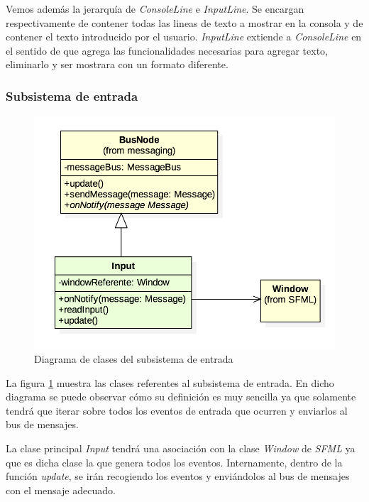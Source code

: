 \bigskip

Vemos además la jerarquía de \textit{ConsoleLine} e \textit{InputLine}. Se encargan respectivamente de contener todas las lineas de texto a mostrar en la consola y de contener el texto introducido por el usuario. \textit{InputLine} extiende a \textit{ConsoleLine} en el sentido de que agrega las funcionalidades necesarias para agregar texto, eliminarlo y ser mostrara con un formato diferente.

\subsubsection*{Subsistema de entrada}

\begin{figure}
	\centerline{\includegraphics[width=12cm]{otros/UML/png/alld/png/input__diagramaDeClases_input_8.png}}
	\caption{Diagrama de clases del subsistema de entrada}
	\label{class:input}
\end{figure}

La figura \ref{class:input} muestra las clases referentes al subsistema de entrada. En dicho diagrama se puede observar cómo su definición es muy sencilla ya que solamente tendrá que iterar sobre todos los eventos de entrada que ocurren y enviarlos al bus de mensajes.

\bigskip

La clase principal \textit{Input} tendrá una asociación con la clase \textit{Window} de \textit{SFML} ya que es dicha clase la que genera todos los eventos. Internamente, dentro de la función \textit{update}, se irán recogiendo los eventos y enviándolos al bus de mensajes con el mensaje adecuado.


